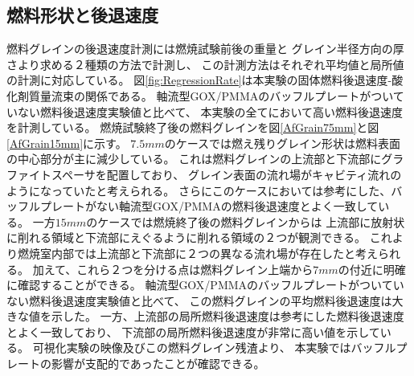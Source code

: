 \subsection{燃料形状と後退速度}
燃料グレインの後退速度計測には燃焼試験前後の重量と
グレイン半径方向の厚さより求める２種類の方法で計測し、
この計測方法はそれぞれ平均値と局所値の計測に対応している。
図\ref{fig:RegressionRate}は本実験の固体燃料後退速度-酸化剤質量流束の関係である。
軸流型GOX/PMMAのバッフルプレートがついていない燃料後退速度実験値と比べて、
本実験の全てにおいて高い燃料後退速度を計測している。
燃焼試験終了後の燃料グレインを図\ref{AfGrain75mm}と図\ref{AfGrain15mm}に示す。
$7.5mm$のケースでは燃え残りグレイン形状は燃料表面の中心部分が主に減少している。
これは燃料グレインの上流部と下流部にグラファイトスペーサを配置しており、
グレイン表面の流れ場がキャビティ流れのようになっていたと考えられる。
さらにこのケースにおいては参考にした、バッフルプレートがない軸流型GOX/PMMAの燃料後退速度とよく一致している。
一方$15mm$のケースでは燃焼終了後の燃料グレインからは
上流部に放射状に削れる領域と下流部にえぐるように削れる領域の２つが観測できる。
これより燃焼室内部では上流部と下流部に２つの異なる流れ場が存在したと考えられる。
加えて、これら２つを分ける点は燃料グレイン上端から$7mm$の付近に明確に確認することができる。
軸流型GOX/PMMAのバッフルプレートがついていない燃料後退速度実験値と比べて、
この燃料グレインの平均燃料後退速度は大きな値を示した。
一方、上流部の局所燃料後退速度は参考にした燃料後退速度とよく一致しており、
下流部の局所燃料後退速度が非常に高い値を示している。
可視化実験の映像及びこの燃料グレイン残渣より、
本実験ではバッフルプレートの影響が支配的であったことが確認できる。
